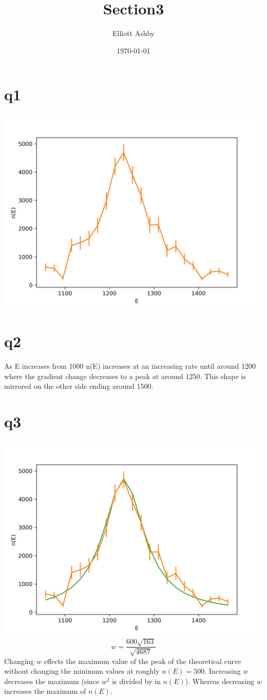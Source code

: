 \documentclass[a4paper,english]{article}
\title{Section3}
\author{Elliott Ashby}
\date{\today}
\begin{document}
    \maketitle
    \section{q1}
    \includegraphics[scale=0.8]{./q3_1.png}
    \section{q2}
        As E increases from 1000 n(E) increases at an increasing rate
        until around 1200 where the gradient change decreases to a peak at 
        around 1250. This shape is mirrored on the other side ending around
        1500.
    \section{q3}
    \includegraphics[scale=0.8]{./q3_1th.png}
        \begin{equation}
            w = \frac{600\sqrt{163}}{\sqrt{4687}}
        \end{equation}
        Changing $w$ effects the maximum value of the peak of the theoretical curve
        without changing the minimum values at roughly $n(E) = 500$. Increasing $w$
        decreases the maximum (since $w^2$ is divided by in $n(E)$). Whereas decreasing
        $w$ increases the maximum of $n(E)$.
\end{document}
